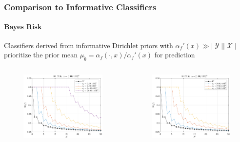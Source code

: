 \documentclass[aspectratio=169]{beamer}
\DeclareMathOperator{\Xcal}{\mathcal{X}}
\DeclareMathOperator{\Ycal}{\mathcal{Y}}
\begin{document}
\begin{frame}
\frametitle{Comparison to Informative Classifiers}
\framesubtitle{Bayes Risk}

Classifiers derived from informative Dirichlet priors with $\alpha_f'(x) \gg |\Ycal||\Xcal|$ prioritize the prior mean $\mu_{\tilde{\uptheta}} = \alpha_f(\cdot,x) / \alpha_f'(x)$ for prediction

\vspace{-0.5em}
\begin{columns}[T]

\begin{column}{.5\linewidth}

\begin{figure}
\centering
\includegraphics[width=0.8\linewidth]{Risk_01_Dir_N_leg_f_a0.pdf}
\label{fig:Risk_01_Dir_N_leg_f_a0}
\end{figure}
\vspace{-2.5em}
\centering
\footnotesize

\end{column}

\begin{column}{.5\linewidth}

\begin{figure}
\centering
\includegraphics[width=0.8\linewidth]{Risk_01_Dir_N_leg_f_mu.pdf}
\label{fig:Risk_01_Dir_N_leg_f_mu}
\end{figure}
\vspace{-2.5em}
\centering
\footnotesize


\end{column}
\end{columns}
\end{frame}
\end{document}
